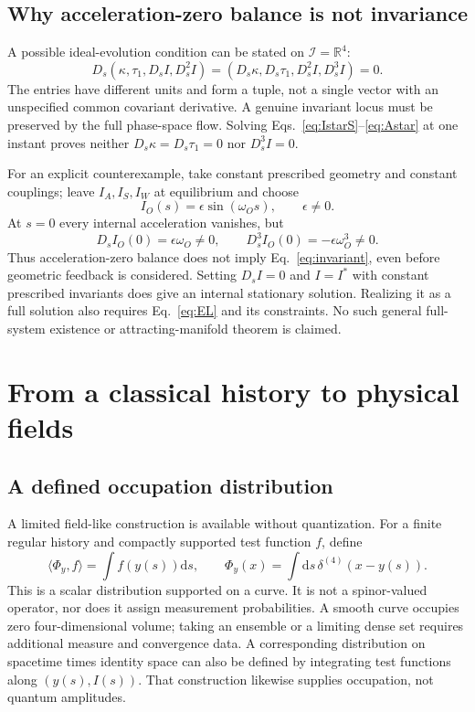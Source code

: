 \documentclass[11pt]{article}
\newcommand{\dd}{\mathrm d}
\newcommand{\Ds}{D_s}
\newcommand{\I}{\mathcal I}
\begin{document}
\subsection{Why acceleration-zero balance is not invariance}
A possible ideal-evolution condition can be stated on $\I=\mathbb R^4$:
\begin{equation}
 \Ds(\kappa,\tau_1,\Ds I,\Ds^2I)
 =(\Ds\kappa,\Ds\tau_1,\Ds^2I,\Ds^3I)=0.
 \label{eq:invariant}
\end{equation}
The entries have different units and form a tuple, not a single vector with an unspecified common covariant derivative. A genuine invariant locus must be preserved by the full phase-space flow. Solving Eqs.~\eqref{eq:IstarS}--\eqref{eq:Astar} at one instant proves neither $\Ds\kappa=\Ds\tau_1=0$ nor $\Ds^3I=0$.

For an explicit counterexample, take constant prescribed geometry and constant couplings; leave $I_A,I_S,I_W$ at equilibrium and choose
\begin{equation}
 I_O(s)=\epsilon\sin(\omega_Os),\qquad \epsilon\ne0.
\end{equation}
At $s=0$ every internal acceleration vanishes, but
\begin{equation}
 \Ds I_O(0)=\epsilon\omega_O\ne0,\qquad
 \Ds^3I_O(0)=-\epsilon\omega_O^3\ne0.
\end{equation}
Thus acceleration-zero balance does not imply Eq.~\eqref{eq:invariant}, even before geometric feedback is considered. Setting $\Ds I=0$ and $I=I^*$ with constant prescribed invariants does give an internal stationary solution. Realizing it as a full solution also requires Eq.~\eqref{eq:EL} and its constraints. No such general full-system existence or attracting-manifold theorem is claimed.


\section{From a classical history to physical fields}
\subsection{A defined occupation distribution}
A limited field-like construction is available without quantization. For a finite regular history and compactly supported test function $f$, define
\begin{equation}
\langle\Phi_y,f\rangle=\int f(y(s))\dd s,\qquad
\Phi_y(x)=\int\dd s\,\delta^{(4)}(x-y(s)).\label{eq:occupation}
\end{equation}
This is a scalar distribution supported on a curve. It is not a spinor-valued operator, nor does it assign measurement probabilities. A smooth curve occupies zero four-dimensional volume; taking an ensemble or a limiting dense set requires additional measure and convergence data. A corresponding distribution on spacetime times identity space can also be defined by integrating test functions along $(y(s),I(s))$. That construction likewise supplies occupation, not quantum amplitudes.
\end{document}
